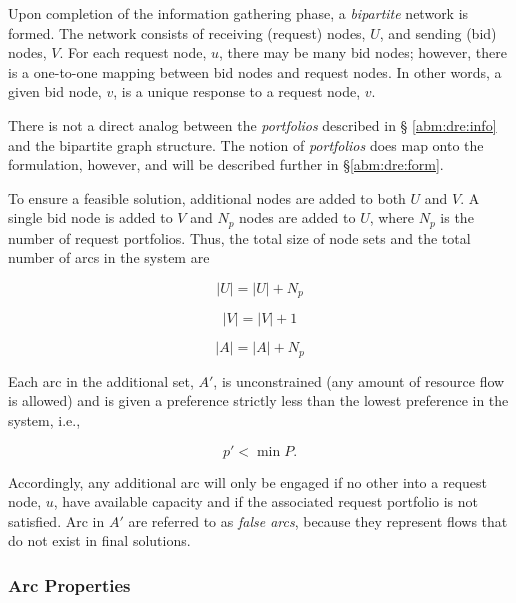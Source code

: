 Upon completion of the information gathering phase, a \textit{bipartite} network
is formed. The network consists of receiving (request) nodes, $U$, and sending
(bid) nodes, $V$. For each request node, $u$, there may be many bid nodes;
however, there is a one-to-one mapping between bid nodes and request nodes. In
other words, a given bid node, $v$, is a unique response to a request node, $v$.


There is not a direct analog between the \textit{portfolios} described in \S
\ref{abm:dre:info} and the bipartite graph structure. The notion of
\textit{portfolios} does map onto the formulation, however, and will be
described further in \S \ref{abm:dre:form}.

To ensure a feasible solution, additional nodes are added to both $U$
and $V$. A single bid node is added to $V$ and $N_{p}$ nodes are added to $U$,
where $N_{p}$ is the number of request portfolios. Thus, the total size of node
sets and the total number of arcs in the system are

\begin{equation}
  \left|{U}\right| = \left|{U}\right| + N_{p}
\end{equation}

\begin{equation}
  \left|{V}\right| = \left|{V}\right| + 1
\end{equation}

\begin{equation}
  \left|{A}\right| = \left|{A}\right| + N_{p}
\end{equation}

Each arc in the additional set, $A'$, is unconstrained (any amount of resource
flow is allowed) and is given a preference strictly less than the lowest
preference in the system, i.e.,

\begin{equation}
  p' < \min P.
\end{equation}

Accordingly, any additional arc will only be engaged if no other into a request
node, $u$, have available capacity and if the associated request portfolio is
not satisfied. Arc in $A'$ are referred to as \textit{false arcs}, because they
represent flows that do not exist in final solutions.


\subsubsection{Arc Properties}

